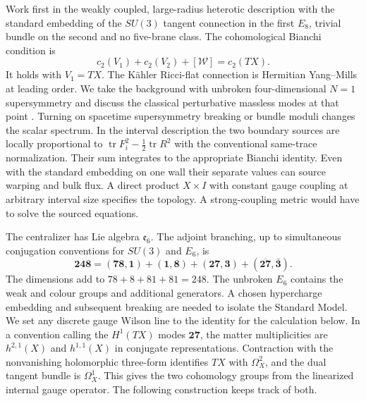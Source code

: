 \documentclass[aps,prd,reprint,onecolumn,nofootinbib,amsmath,amssymb]{revtex4-2}
\begin{document}
Work first in the weakly coupled, large-radius heterotic description with the standard embedding of the $SU(3)$ tangent connection in the first $E_8$, trivial bundle on the second and no five-brane class. The cohomological Bianchi condition is
\begin{equation}
 c_2(V_1)+c_2(V_2)+[\mathcal W]=c_2(TX).
 \label{eq:bianchi}
\end{equation}
It holds with $V_1=TX$. The Kähler Ricci-flat connection is Hermitian Yang--Mills at leading order. We take the background with unbroken four-dimensional $N=1$ supersymmetry and discuss the classical perturbative massless modes at that point \cite{CHSW1985}. Turning on spacetime supersymmetry breaking or bundle moduli changes the scalar spectrum. In the interval description the two boundary sources are locally proportional to $\operatorname{tr}F_i^2-\tfrac12\operatorname{tr}R^2$ with the conventional same-trace normalization. Their sum integrates to the appropriate Bianchi identity. Even with the standard embedding on one wall their separate values can source warping and bulk flux. A direct product $X\times I$ with constant gauge coupling at arbitrary interval size specifies the topology. A strong-coupling metric would have to solve the sourced equations.

The centralizer has Lie algebra $\mathfrak e_6$. The adjoint branching, up to simultaneous conjugation conventions for $SU(3)$ and $E_6$, is
\begin{equation}
 \mathbf{248}=(\mathbf{78},\mathbf1)+(\mathbf1,\mathbf8)
 +(\mathbf{27},\mathbf3)
 +(\overline{\mathbf{27}},\bar{\mathbf3}).
 \label{eq:eight}
\end{equation}
The dimensions add to $78+8+81+81=248$. The unbroken $E_6$ contains the weak and colour groups and additional generators. A chosen hypercharge embedding and subsequent breaking are needed to isolate the Standard Model. We set any discrete gauge Wilson line to the identity for the calculation below. In a convention calling the $H^1(TX)$ modes $\mathbf{27}$, the matter multiplicities are $h^{2,1}(X)$ and $h^{1,1}(X)$ in conjugate representations. Contraction with the nonvanishing holomorphic three-form identifies $TX$ with $\Omega^2_X$, and the dual tangent bundle is $\Omega^1_X$. This gives the two cohomology groups from the linearized internal gauge operator. The following construction keeps track of both.
\end{document}
